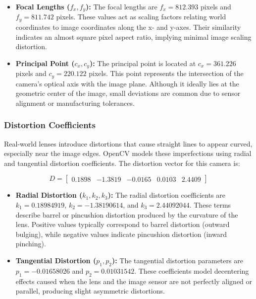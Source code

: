 \begin{itemize}
    \item \textbf{Focal Lengths (\(f_x, f_y\)):}  
    The focal lengths are \( f_x = 812.393 \) pixels and \( f_y = 811.742 \) pixels. These values act as scaling factors relating world coordinates to image coordinates along the x- and y-axes. Their similarity indicates an almost square pixel aspect ratio, implying minimal image scaling distortion.
    
    \item \textbf{Principal Point (\(c_x, c_y\)):}  
    The principal point is located at \( c_x = 361.226 \) pixels and \( c_y = 220.122 \) pixels. This point represents the intersection of the camera’s optical axis with the image plane. Although it ideally lies at the geometric center of the image, small deviations are common due to sensor alignment or manufacturing tolerances.
\end{itemize}


\subsubsection{Distortion Coefficients}
Real-world lenses introduce distortions that cause straight lines to appear curved, especially near the image edges. OpenCV models these imperfections using radial and tangential distortion coefficients. The distortion vector for this camera is:

\[
D =
\begin{bmatrix}
0.1898 & -1.3819 & -0.0165 & 0.0103 & 2.4409
\end{bmatrix}
\]

\begin{itemize}
    \item \textbf{Radial Distortion (\(k_1, k_2, k_3\)):}  
    The radial distortion coefficients are \( k_1 = 0.18984919 \), \( k_2 = -1.38190614 \), and \( k_3 = 2.44092044 \). These terms describe barrel or pincushion distortion produced by the curvature of the lens. Positive values typically correspond to barrel distortion (outward bulging), while negative values indicate pincushion distortion (inward pinching).

    \item \textbf{Tangential Distortion (\(p_1, p_2\)):}  
    The tangential distortion parameters are \( p_1 = -0.01658026 \) and \( p_2 = 0.01031542 \). These coefficients model decentering effects caused when the lens and the image sensor are not perfectly aligned or parallel, producing slight asymmetric distortions.
\end{itemize}

